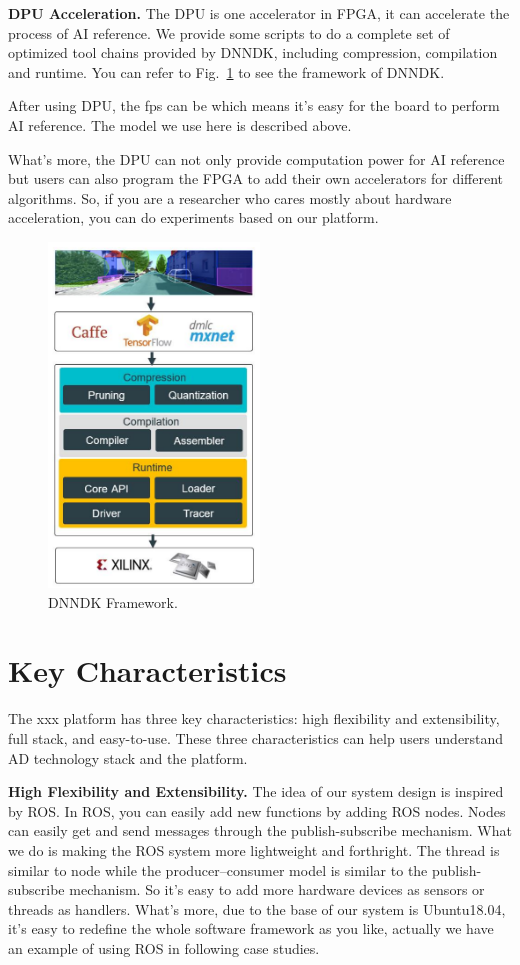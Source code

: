 \documentclass[conference]{IEEEtran}
\begin{document}
\textbf{DPU Acceleration. }The DPU\cite{b17} is one accelerator in FPGA, it can accelerate the process of AI reference. We provide some scripts to do a complete set of optimized tool chains provided by DNNDK, including compression, compilation and runtime. You can refer to Fig.~\ref{df} to see the framework of DNNDK. 

After using DPU, the fps can be which means it's easy for the board to perform AI reference. The model we use here is described above. 

What's more, the DPU can not only provide computation power for AI reference but users can also program the FPGA to add their own accelerators for different algorithms. So, if you are a researcher who cares mostly about hardware acceleration, you can do experiments based on our platform.

\begin{figure}[htbp]
\centerline{\includegraphics[width=0.5\textwidth,height=0.5\textheight]{DNNDK.PNG}}
\caption{DNNDK Framework\cite{b17}.}
\label{df}
\end{figure}

\section{Key Characteristics}
The xxx platform has three key characteristics: high flexibility and extensibility, full stack, and easy-to-use. These three characteristics can help users understand AD technology stack and the platform.

\textbf{High Flexibility and Extensibility. }The idea of our system design is inspired by ROS. In ROS, you can easily add new functions by adding ROS nodes. Nodes can easily get and send messages through the publish-subscribe mechanism. What we do is making the ROS system more lightweight and forthright. The thread is similar to node while the producer–consumer model is similar to the publish-subscribe mechanism. So it's easy to add more hardware devices as sensors or threads as handlers. What's more, due to the base of our system is Ubuntu18.04, it's easy to redefine the whole software framework as you like, actually we have an example of using ROS in following case studies.
\end{document}
